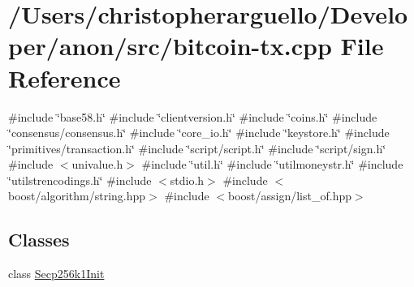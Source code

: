 \hypertarget{bitcoin-tx_8cpp}{}\section{/\+Users/christopherarguello/\+Developer/anon/src/bitcoin-\/tx.cpp File Reference}
\label{bitcoin-tx_8cpp}
{\ttfamily \#include \char`\"{}base58.\+h\char`\"{}}\newline
{\ttfamily \#include \char`\"{}clientversion.\+h\char`\"{}}\newline
{\ttfamily \#include \char`\"{}coins.\+h\char`\"{}}\newline
{\ttfamily \#include \char`\"{}consensus/consensus.\+h\char`\"{}}\newline
{\ttfamily \#include \char`\"{}core\+\_\+io.\+h\char`\"{}}\newline
{\ttfamily \#include \char`\"{}keystore.\+h\char`\"{}}\newline
{\ttfamily \#include \char`\"{}primitives/transaction.\+h\char`\"{}}\newline
{\ttfamily \#include \char`\"{}script/script.\+h\char`\"{}}\newline
{\ttfamily \#include \char`\"{}script/sign.\+h\char`\"{}}\newline
{\ttfamily \#include $<$univalue.\+h$>$}\newline
{\ttfamily \#include \char`\"{}util.\+h\char`\"{}}\newline
{\ttfamily \#include \char`\"{}utilmoneystr.\+h\char`\"{}}\newline
{\ttfamily \#include \char`\"{}utilstrencodings.\+h\char`\"{}}\newline
{\ttfamily \#include $<$stdio.\+h$>$}\newline
{\ttfamily \#include $<$boost/algorithm/string.\+hpp$>$}\newline
{\ttfamily \#include $<$boost/assign/list\+\_\+of.\+hpp$>$}\newline
\subsection*{Classes}
\begin{DoxyCompactItemize}
\item 
class \mbox{\hyperlink{class_secp256k1_init}{Secp256k1\+Init}}
\end{DoxyCompactItemize}
